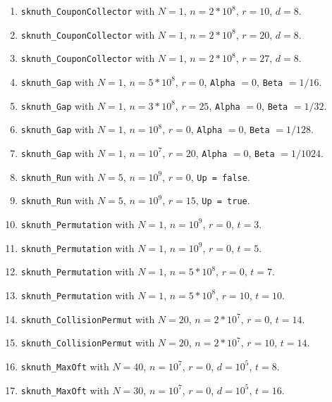 \begin{enumerate}
  \item {\tt sknuth\_CouponCollector} with $N=1$, $n=2*10^8$, $r=10$, $d=8$.

  \item {\tt sknuth\_CouponCollector} with $N=1$, $n=2*10^8$, $r=20$, $d=8$.

  \item {\tt sknuth\_CouponCollector} with $N=1$, $n=2*10^8$, $r=27$, $d=8$.

  \item {\tt sknuth\_Gap} with $N=1$, $n=5*10^8$, $r=0$, {\tt Alpha} $=0$,
    {\tt Beta} $=1/16$.

  \item {\tt sknuth\_Gap} with $N=1$, $n=3*10^8$, $r=25$, {\tt Alpha} $=0$,
    {\tt Beta} $=1/32$.

  \item {\tt sknuth\_Gap} with $N=1$, $n=10^8$, $r=0$, {\tt Alpha} $=0$,
    {\tt Beta} $=1/128$.

  \item {\tt sknuth\_Gap} with $N=1$, $n=10^7$, $r=20$, {\tt Alpha} $=0$,
   {\tt Beta} $=1/1024$.

  \item {\tt sknuth\_Run}  with $N=5$, $n=10^9$, $r=0$, {\tt Up = false}.

  \item {\tt sknuth\_Run}  with $N=5$, $n=10^9$, $r=15$, {\tt Up = true}.

  \item {\tt sknuth\_Permutation} with $N=1$, $n=10^9$, $r=0$, $t=3$.

  \item {\tt sknuth\_Permutation} with $N=1$, $n=10^9$, $r=0$, $t=5$.

  \item {\tt sknuth\_Permutation} with $N=1$, $n=5*10^8$, $r=0$, $t=7$.

  \item {\tt sknuth\_Permutation} with $N=1$, $n=5*10^8$, $r=10$, $t=10$.

  \item {\tt sknuth\_CollisionPermut} with $N=20$, $n=2*10^7$, $r=0$, $t=14$.

  \item {\tt sknuth\_CollisionPermut} with $N=20$, $n=2*10^7$, $r=10$, $t=14$.

  \item {\tt sknuth\_MaxOft} with $N=40$, $n=10^7$, $r=0$, $d=10^5$, $t=8$.

  \item {\tt sknuth\_MaxOft} with $N=30$, $n=10^7$, $r=0$, $d=10^5$, $t=16$.


\end{enumerate}
